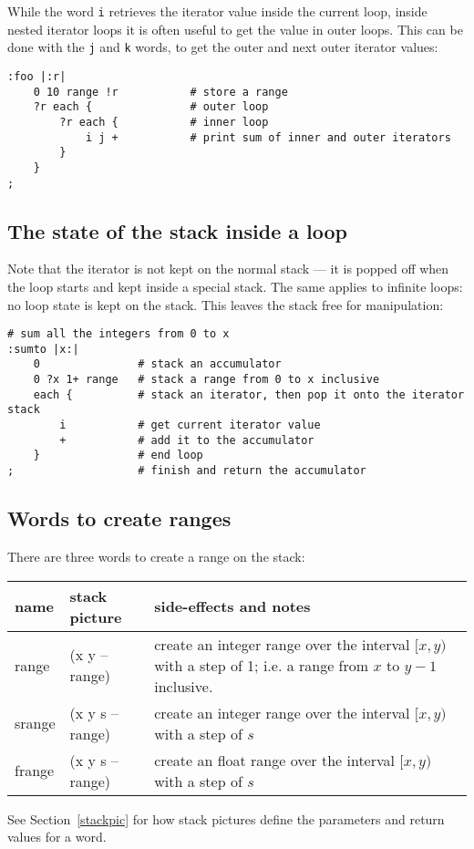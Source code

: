 While the word \texttt{i} retrieves the iterator value inside the current
loop, inside nested iterator loops it is often useful to get the value
in outer loops. This can be done with the \texttt{j} and \texttt{k} words,
to get the outer and next outer iterator values:
\begin{lstlisting}
:foo |:r|
    0 10 range !r           # store a range
    ?r each {               # outer loop
        ?r each {           # inner loop
            i j +           # print sum of inner and outer iterators
        }
    }
;
\end{lstlisting}

\subsection{The state of the stack inside a loop}
Note that the iterator is not kept on the normal stack --- it is popped
off when the loop starts and kept inside a special stack. The same
applies to infinite loops: no loop state is kept on the stack. This 
leaves the stack free for manipulation:
\begin{lstlisting}
# sum all the integers from 0 to x
:sumto |x:|
    0               # stack an accumulator
    0 ?x 1+ range   # stack a range from 0 to x inclusive
    each {          # stack an iterator, then pop it onto the iterator stack
        i           # get current iterator value
        +           # add it to the accumulator
    }               # end loop
;                   # finish and return the accumulator
\end{lstlisting}

\subsection{Words to create ranges}
There are three words to create a range on the stack:
\begin{center}
\begin{tabular}{|l|l|p{4in}|}\hline
\textbf{name} & \textbf{stack picture} & \textbf{side-effects and notes}\\ \hline
range & (x y -- range) & create an integer range over the interval $[x,y)$ with a step of 1; i.e. a range from $x$ to $y-1$ inclusive.\\
srange & (x y s -- range) &  create an integer range over the interval $[x,y)$ with a step of $s$\\
frange & (x y s -- range) &  create an float range over the interval $[x,y)$ with a step of $s$\\
\hline
\end{tabular}
\end{center}
See Section~\ref{stackpic} for how stack pictures define the parameters
and return values for a word.

